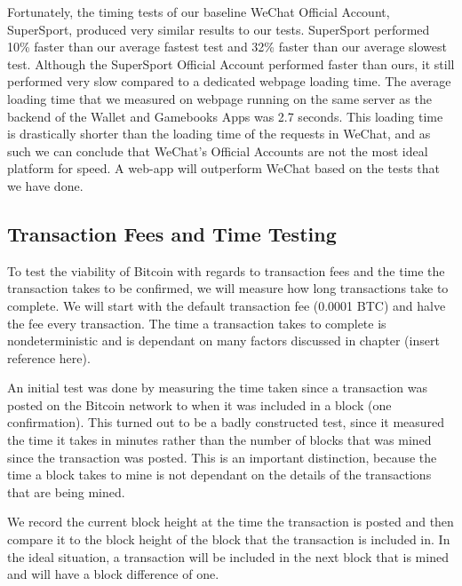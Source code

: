 Fortunately, the timing tests of our baseline WeChat Official Account, SuperSport, produced very similar results to our tests. SuperSport performed 10\% faster than our average fastest test and 32\% faster than our average slowest test. Although the SuperSport Official Account performed faster than ours, it still performed very slow compared to a dedicated webpage loading time. The average loading time that we measured on webpage running on the same server as the backend of the Wallet and Gamebooks Apps was 2.7 seconds. This loading time is drastically shorter than the loading time of the requests in WeChat, and as such we can conclude that WeChat's Official Accounts are not the most ideal platform for speed. A web-app will outperform WeChat based on the tests that we have done. 


\subsection{Transaction Fees and Time Testing}

To test the viability of Bitcoin with regards to transaction fees and the time the transaction takes to be confirmed, we will measure how long transactions take to complete. We will start with the default transaction fee (0.0001 BTC) and halve the fee every transaction. The time a transaction takes to complete is nondeterministic and is dependant on many factors discussed in chapter ({{insert reference here}}). 

An initial test was done by measuring the time taken since a transaction was posted on the Bitcoin network to when it was included in a block (one confirmation). This turned out to be a badly constructed test, since it measured the time it takes in minutes rather than the number of blocks that was mined since the transaction was posted. This is an important distinction, because the time a block takes to mine is not dependant on the details of the transactions that are being mined.

We record the current block height at the time the transaction is posted and then compare it to the block height of the block that the transaction is included in. In the ideal situation, a transaction will be included in the next block that is mined and will have a block difference of one.


